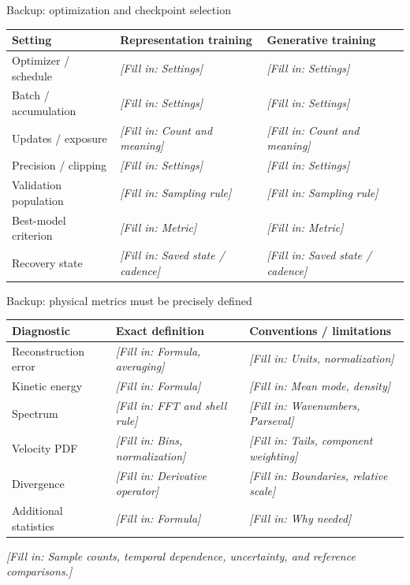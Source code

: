 \documentclass[aspectratio=169,11pt]{beamer}
\newcommand{\fillin}[1]{{\color{prompt}\textit{[Fill in: #1]}}}
\begin{document}
\begin{frame}{Backup: optimization and checkpoint selection}
  \small
  \begin{tabularx}{\linewidth}{lXX}
    \toprule
    Setting & Representation training & Generative training \\
    \midrule
    Optimizer / schedule & \fillin{Settings} & \fillin{Settings} \\
    Batch / accumulation & \fillin{Settings} & \fillin{Settings} \\
    Updates / exposure & \fillin{Count and meaning} & \fillin{Count and meaning} \\
    Precision / clipping & \fillin{Settings} & \fillin{Settings} \\
    Validation population & \fillin{Sampling rule} & \fillin{Sampling rule} \\
    Best-model criterion & \fillin{Metric} & \fillin{Metric} \\
    Recovery state & \fillin{Saved state / cadence} & \fillin{Saved state / cadence} \\
    \bottomrule
  \end{tabularx}
\end{frame}

\begin{frame}{Backup: physical metrics must be precisely defined}
  \small
  \begin{tabularx}{\linewidth}{lXX}
    \toprule
    Diagnostic & Exact definition & Conventions / limitations \\
    \midrule
    Reconstruction error & \fillin{Formula, averaging} & \fillin{Units, normalization} \\
    Kinetic energy & \fillin{Formula} & \fillin{Mean mode, density} \\
    Spectrum & \fillin{FFT and shell rule} & \fillin{Wavenumbers, Parseval} \\
    Velocity PDF & \fillin{Bins, normalization} & \fillin{Tails, component weighting} \\
    Divergence & \fillin{Derivative operator} & \fillin{Boundaries, relative scale} \\
    Additional statistics & \fillin{Formula} & \fillin{Why needed} \\
    \bottomrule
  \end{tabularx}
  \medskip
  \fillin{Sample counts, temporal dependence, uncertainty, and reference comparisons.}
\end{frame}
\end{document}

